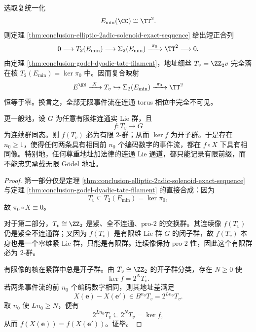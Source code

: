 \begin{theorem}\label{thm:conclusion-godel-filament-connected-lie-blindness}
选取复统一化
\[
E_{\min}(\CC)\cong \TT^2.
\]
则定理 \ref{thm:conclusion-elliptic-2adic-solenoid-exact-sequence} 给出短正合列
\[
0\longrightarrow T_2(E_{\min})\longrightarrow \Sigma_2(E_{\min})\xrightarrow{\ \pi_0\ }\TT^2\longrightarrow 0.
\]
由定理 \ref{thm:conclusion-godel-dyadic-tate-filament}，地址细丝 \(T_v=\ZZ_2v\) 完全落在核 \(T_2(E_{\min})=\ker \pi_0\) 中。因而复合映射
\[
E^{\NN}\xrightarrow{\ X\ }T_v\hookrightarrow \Sigma_2(E_{\min})\xrightarrow{\ \pi_0\ }\TT^2
\]
恒等于零。换言之，全部无限事件流在连通 torus 相位中完全不可见。

更一般地，设 \(G\) 为任意有限维连通实 Lie 群，且
\[
f:T_v\longrightarrow G
\]
为连续群同态。则 \(f(T_v)\) 必为有限 \(2\)-群；从而 \(\ker f\) 为开子群。于是存在 \(n_0\ge 1\)，使得任何两条具有相同前 \(n_0\) 个编码数字的事件流，都在 \(f\circ X\) 下具有相同像。特别地，任何尊重地址加法律的连通 Lie 通道，都只能记录有限前缀，而不能忠实承载无限 Gödel 地址。
\end{theorem}
\begin{proof}
第一部分仅是定理 \ref{thm:conclusion-elliptic-2adic-solenoid-exact-sequence} 与定理 \ref{thm:conclusion-godel-dyadic-tate-filament} 的直接合成：因为
\[
T_v\subseteq T_2(E_{\min})=\ker \pi_0,
\]
故 \(\pi_0\circ X\equiv 0\)。

对于第二部分，\(T_v\cong \ZZ_2\) 是紧、全不连通、pro-\(2\) 的交换群。其连续像 \(f(T_v)\) 仍是紧全不连通群；又因为 \(f(T_v)\) 是有限维 Lie 群 \(G\) 的闭子群，故 \(f(T_v)\) 本身也是一个零维紧 Lie 群，只能是有限群。连续像保持 pro-\(2\) 性，因此这个有限群必为 \(2\)-群。

有限像的核在紧群中总是开子群。由 \(T_v\cong \ZZ_2\) 的开子群分类，存在 \(N\ge 0\) 使
\[
\ker f=2^N T_v.
\]
若两条事件流的前 \(n_0\) 个编码数字相同，则其地址差满足
\[
X(\mathbf e)-X(\mathbf e')
\in
B^{n_0}T_v
=
2^{Ln_0}T_v.
\]
取 \(n_0\) 使 \(Ln_0\ge N\)，便有
\[
2^{Ln_0}T_v\subseteq 2^N T_v=\ker f,
\]
从而 \(f(X(\mathbf e))=f(X(\mathbf e'))\)。证毕。
\end{proof}

